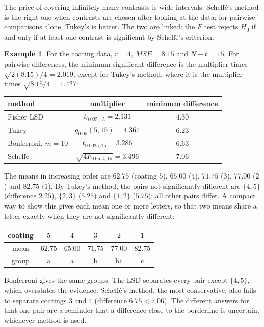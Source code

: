 \documentclass[11pt,a4paper]{article}
\numberwithin{equation}{section}
\theoremstyle{definition}
\newtheorem{exa}[thm]{Example}
\begin{document}
The price of covering infinitely many contrasts is wide intervals. Scheff\'e's method is the right one when contrasts are chosen after looking
at the data; for pairwise comparisons alone, Tukey's is better. The two are linked: the $F$ test rejects $H_0$ if and only if at least one contrast is
significant by Scheff\'e's criterion.

\begin{exa}\label{exa:coating-mc}
For the coating data, $r = 4$, $MSE = 8.15$ and $N - t = 15$. For pairwise differences, the minimum significant difference is the multiplier times $\sqrt{2(8.15)/4} = 2.019$, except for Tukey's method, where it is the multiplier times $\sqrt{8.15/4} = 1.427$:
\begin{center}
\begin{tabular}{l|c|c}
method & multiplier & minimum difference \\
\hline
Fisher LSD & $t_{0.025,15} = 2.131$ & $4.30$ \\
Tukey & $q_{0.05}(5, 15) = 4.367$ & $6.23$ \\
Bonferroni, $m = 10$ & $t_{0.0025,15} = 3.286$ & $6.63$ \\
Scheff\'e & $\sqrt{4F_{0.05,4,15}} = 3.496$ & $7.06$
\end{tabular}
\end{center}
The means in increasing order are $62.75$ (coating $5$), $65.00$ ($4$), $71.75$ ($3$), $77.00$ ($2$) and $82.75$ ($1$). By Tukey's method, the pairs not
significantly different are $\{4, 5\}$ (difference $2.25$), $\{2, 3\}$ ($5.25$) and $\{1, 2\}$ ($5.75$); all other pairs differ. A compact way to show this gives each mean one or more letters, so that two means share a letter exactly when they
are not significantly different:
\begin{center}
\begin{tabular}{c|ccccc}
coating & $5$ & $4$ & $3$ & $2$ & $1$ \\
\hline
mean & $62.75$ & $65.00$ & $71.75$ & $77.00$ & $82.75$ \\
group & a & a & b & bc & c
\end{tabular}
\end{center}
Bonferroni gives the same groups. The LSD separates every pair except $\{4, 5\}$, which overstates the evidence. Scheff\'e's method, the most
conservative, also fails to separate coatings $3$ and $4$ (difference $6.75 < 7.06$). The different answers for that one pair are a reminder that a
difference close to the borderline is uncertain, whichever method is used.
\end{exa}
\end{document}
